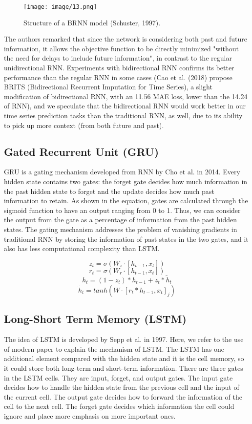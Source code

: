 \documentclass[letterpaper, 10 pt, conference]{ieeeconf}  %
\begin{document}
        \begin{figure}[thpb]
            \centering
             \texttt{[image: image/13.png]}
            \caption{Structure of a BRNN model (Schuster, 1997).}
            \label{figurelabel}
        \end{figure}

        The authors remarked that since the network is considering both past and future information, it allows the objective function to be directly minimized "without the need for delays to include future information", in contrast to the regular unidirectional RNN. Experiments with bidirectional RNN confirms its better performance than the regular RNN in some cases (Cao et al. (2018) propose BRITS (Bidirectional Recurrent Imputation for Time Series), a slight modification of bidirectional RNN, with an 11.56 MAE loss, lower than the 14.24 of RNN), and we speculate that the bidirectional RNN would work better in our time series prediction tasks than the traditional RNN, as well, due to its ability to pick up more context (from both future and past).

    \subsection{Gated Recurrent Unit (GRU)}
        GRU is a gating mechanism developed from RNN by Cho et al. in 2014. Every hidden state contains two gates: the forget gate decides how much information in the past hidden state to forget and the update decides how much past information to retain. As shown in the equation, gates are calculated through the sigmoid function to have an output ranging from 0 to 1. Thus, we can consider the output from the gate as a percentage of information from the past hidden states. The gating mechanism addresses the problem of vanishing gradients in traditional RNN by storing the information of past states in the two gates, and it also has less computational complexity than LSTM.

        $$ z_t = \sigma(W_z \cdot [h_{t-1},x_t])$$
        $$ r_t = \sigma(W_r \cdot [h_{t-1},x_t])$$
        $$ h_t = (1-z_t) \ast h_{t-1} + z_t \ast \tilde{h}_t$$
        $$ \tilde h_t = tanh(W \cdot [r_t \ast h_{t-1}, x_t]_j)$$

    \subsection{Long-Short Term Memory (LSTM)}
        The idea of LSTM is developed by Sepp et al. in 1997. Here, we refer to the use of modern paper to explain the mechanism of LSTM. The LSTM has one additional element compared with the hidden state and it is the cell memory, so it could store both long-term and short-term information. There are three gates in the LSTM cells. They are input, forget, and output gates. The input gate decides how to handle the hidden state from the previous cell and the input of the current cell. The output gate decides how to forward the information of the cell to the next cell. The forget gate decides which information the cell could ignore and place more emphasis on more important ones. 
\end{document}
